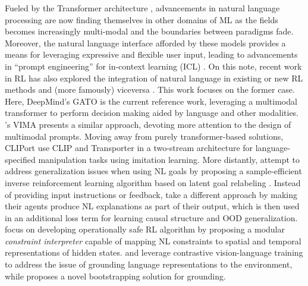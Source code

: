\documentclass[../thesis-proposal/main.tex]{subfiles}
\begin{document}
Fueled by the Transformer architecture \citep{vaswani_attention_2017}, advancements in natural
language processing \citep{vaswani_attention_2017, devlin_bert_2019, brown_language_2020} are now
finding themselves in other domains of ML \citep{radford_learning_2021,
rombach_high-resolution_2022, dhariwal_jukebox_2020} as the fields becomes increasingly multi-modal
\citep{baltrusaitis_multimodal_2019, xu_multimodal_2022} and the boundaries between paradigms fade.
Moreover, the natural language interface afforded by these models provides a means for leveraging
expressive and flexible user input, leading to advancements in ``prompt engineering'' for in-context
learning (ICL) \citep{dohan_language_2022, dosovitskiy_image_2022, reynolds_prompt_2021,
wei_chain--thought_2022, hertz_prompt--prompt_2022}. On this note, recent work in RL has also
explored the integration of natural language in existing or new RL methods
\citep{luketina_survey_2019} and (more famously) viceversa \citep{ouyang_training_2022}. This work
focuses on the former case. Here, DeepMind's GATO \citep{reed_generalist_2022} is the current
reference work, leveraging a multimodal transformer to perform decision making aided by language and
other modalities. 's VIMA presents a similar approach, devoting more
attention to the design of multimodal prompts. Moving away from purely transformer-based solutions,
CLIPort \citep{shridhar_cliport_2021} use CLIP \citep{radford_learning_2021} and Transporter
\citep{zeng_transporter_2021} in a two-stream architecture for language-specified manipulation tasks
using imitation learning. More distantly, \citet{zhou_inverse_2021} attempt to address
generalization issues when using NL goals by proposing a sample-efficient inverse reinforcement
learning algorithm based on latent goal relabeling \citep{nair_visual_2018}. Instead of providing
input instructions or feedback, \citet{lampinen_tell_2022} take a different approach by making their
agents produce NL explanations as part of their output, which is then used in an additional loss
term for learning causal structure and OOD generalization.  focus on
developing operationally safe RL algorithm by proposing a modular \textit{constraint interpreter}
capable of mapping NL constraints to spatial and temporal representations of hidden states.
 and \citet{fan_minedojo_2022} leverage contrastive vision-language
training to address the issue of grounding language representations to the environment, while
\citet{watkins_teachable_2021} proposes a novel bootstrapping solution for grounding.
\end{document}
